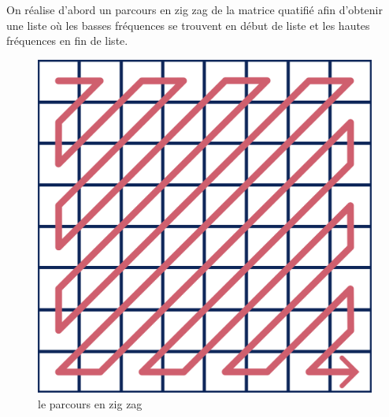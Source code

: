 \documentclass{article}
\begin{document}
On réalise d'abord un parcours en zig zag de la matrice quatifié afin d'obtenir une liste où les basses fréquences se trouvent en début de liste et les hautes fréquences en fin de liste.

\vspace{.5cm}


\begin{minipage}{0.3\textwidth}
    \begin{figure}[H]
        \centering
        \includegraphics[width=0.9\linewidth]{zigzag.png}
        \caption{le parcours en zig zag}
    \end{figure}
\end{minipage}
\hfill
\end{document}
